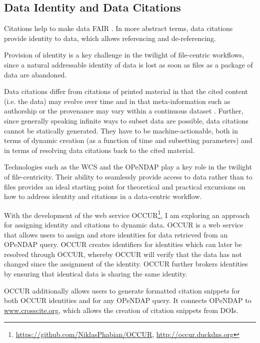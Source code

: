 \documentclass[letterpaper, parskip=half]{scrartcl}
\begin{document}
\newpage

\subsection{Data Identity and Data Citations}
Citations help to make data \acrfull{FAIR} \citep{Wilkinson2016}. In more abstract terms, data citations provide identity to data, which allows referencing and de-referencing.

Provision of identity is a key challenge in the twilight of file-centric workflows, since a natural addressable identity of data is lost as soon as files as a package of data are abandoned.

Data citations differ from citations of printed material in that the cited content (i.e. the data) may evolve over time and in that meta-information such as authorship or the provenance may vary within a continuous dataset \citep{Buneman2016}. Further, since generally speaking infinite ways to subset data are possible, data citations cannot be statically generated. They have to be machine-actionable, both in terms of dynamic creation (as a function of time and subsetting parameters) and in terms of resolving data citations back to the cited material.

Technologies such as the \gls{WCS} and the \gls{OPeNDAP} \citep{Gallagher2005} play a key role in the twilight of file-centricity. Their ability to seamlessly provide access to data rather than to files provides an ideal starting point for theoretical and practical excursions on how to address identity and citations in a data-centric workflow. 


With the development of the web service
\gls{OCCUR}\footnote{\url{https://github.com/NiklasPhabian/OCCUR},
\url{http://occur.duckdns.org}}, I am exploring an approach for assigning identity and citations to dynamic data.
\Gls{OCCUR} is a web service that allows users to assign and store identities for data retrieved from an \gls{OPeNDAP} query. 
OCCUR creates identifiers for identities which can later be resolved through \gls{OCCUR}, whereby \gls{OCCUR} will verify that the data has not changed since the assignment of the identity. OCCUR further brokers identities by ensuring that identical data is sharing the same identity.

\gls{OCCUR} additionally allows users to generate formatted citation snippets for both OCCUR identities and for any \gls{OPeNDAP} query. It connects \gls{OPeNDAP} to \url{www.crosscite.org}, which allows the creation of citation snippets from \glspl{DOI}. 
\end{document}

